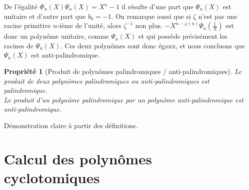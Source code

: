 \documentclass{article}
\theoremstyle{break}                  %
\newtheorem{propriete}{Propriété}
\begin{document}
De l'égalité $\Phi_n(X)\Psi_n(X) = X^n-1$ il résulte d'une part que $\Psi_n(X)$ est unitaire et d'autre part que $b_0=-1$. On remarque aussi que si $\zeta$ n'est pas une racine primitive $n$-ième de l'unité, alors $\zeta^{-1}$ non plus. $-X^{n-\varphi(n)} \Psi_n(\frac{1}{X})$ est donc un polynôme unitaire, comme $\Psi_{n}(X)$ et qui possède précisément les racines de $\Psi_{n}(X)$. Ces deux polynômes sont donc égaux, et nous concluons que $\Psi_{n}(X)$ est anti-palindromique.


\begin{propriete}[Produit de polynômes palindromiques / anti-palindromiques]
	Le produit de deux polynômes palindromiques ou anti-palindromiques est palindromique.\\
	Le produit d'un polynôme palindromique par un polynôme anti-palindromique est anti-palindromique.
\end{propriete}
Démonstration claire à partir des définitions. 

\section*{Calcul des polynômes cyclotomiques}
\end{document}
